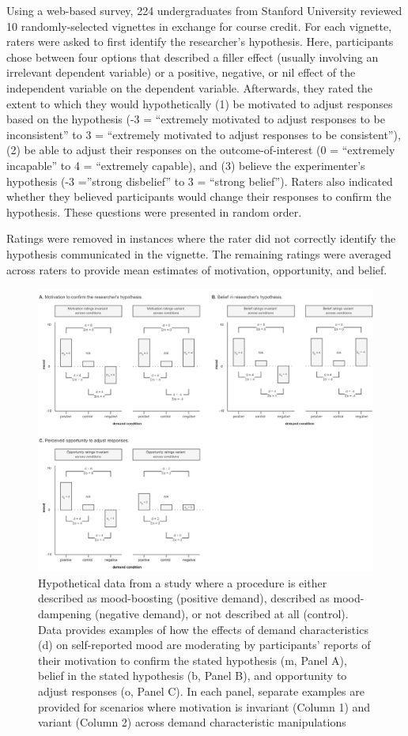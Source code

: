 \documentclass[
  man,floatsintext]{apa6}
\begin{document}
Using a web-based survey, 224 undergraduates from Stanford University reviewed 10 randomly-selected vignettes in exchange for course credit. For each vignette, raters were asked to first identify the researcher's hypothesis. Here, participants chose between four options that described a filler effect (usually involving an irrelevant dependent variable) or a positive, negative, or nil effect of the independent variable on the dependent variable. Afterwards, they rated the extent to which they would hypothetically (1) be motivated to adjust responses based on the hypothesis (-3 = ``extremely motivated to adjust responses to be inconsistent'' to 3 = ``extremely motivated to adjust responses to be consistent''), (2) be able to adjust their responses on the outcome-of-interest (0 = ``extremely incapable'' to 4 = ``extremely capable), and (3) believe the experimenter's hypothesis (-3 =''strong disbelief'' to 3 = ``strong belief''). Raters also indicated whether they believed participants would change their responses to confirm the hypothesis. These questions were presented in random order.

Ratings were removed in instances where the rater did not correctly identify the hypothesis communicated in the vignette. The remaining ratings were averaged across raters to provide mean estimates of motivation, opportunity, and belief.

\begin{figure}
\includegraphics[width=8.03in]{images/metaware_mods} \caption{Hypothetical data from a study where a procedure is either described as mood-boosting (positive demand), described as mood-dampening (negative demand), or not described at all (control). Data provides examples of how the effects of demand characteristics (d) on self-reported mood are moderating by participants' reports of their motivation to confirm the stated hypothesis (m, Panel A), belief in the stated hypothesis (b, Panel B), and opportunity to adjust responses (o, Panel C). In each panel, separate examples are provided for scenarios where motivation is invariant (Column 1) and variant (Column 2) across demand characteristic manipulations}\label{fig:mods}
\end{figure}
\end{document}
